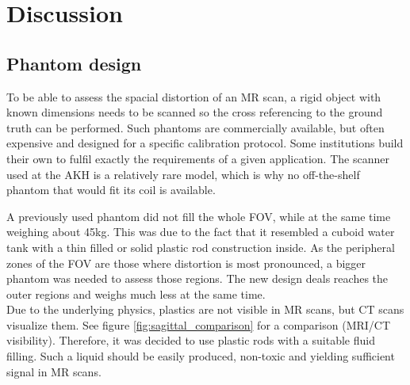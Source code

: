 


\chapter{Discussion}

\section{Phantom design}

To be able to assess the spacial distortion of an MR scan, a rigid object with known dimensions needs to be scanned so the cross referencing to the ground truth can be performed.
Such phantoms are commercially available, but often expensive and designed for a specific calibration protocol.
Some institutions build their own to fulfil exactly the requirements of a given application.
The scanner used at the AKH is a relatively rare model, which is why no off-the-shelf phantom that would fit its coil is available.

A previously used phantom did not fill the whole FOV, while at the same time weighing about 45kg.
This was due to the fact that it resembled a cuboid water tank with a thin filled or solid plastic rod construction inside.
As the peripheral zones of the FOV are those where distortion is most pronounced, a bigger phantom was needed to assess those regions.
The new design deals reaches the outer regions and weighs much less at the same time.\\

Due to the underlying physics, plastics are not visible in MR scans, but CT scans visualize them. 
See figure \ref{fig:sagittal_comparison} for a comparison (MRI/CT visibility).
Therefore, it was decided to use plastic rods with a suitable fluid filling.
Such a liquid should be easily produced, non-toxic and yielding sufficient signal in MR scans.

